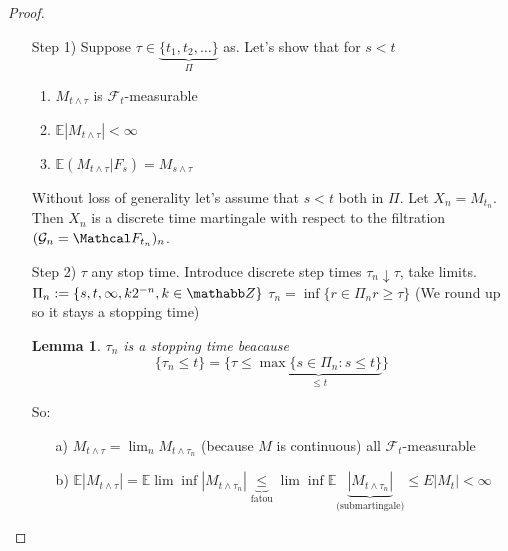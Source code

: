 \documentclass{article}
\newtheorem{lemma}[theorem]{Lemma}
\begin{document}
\begin{proof}
  \begin{enumerate}
  \item[Step 1)]
    Suppose $\tau \in \underbrace{\{t_1, t_2, \ldots\}}_{\Pi}$ as. Let's show that for $s < t$
    \begin{enumerate}
    \item $M_{t\wedge \tau}$ is $\mathcal F_t$-measurable
    \item $\mathbb E |M_{t\wedge \tau}| < \infty$
    \item $\mathbb E(M_{t\wedge \tau} |F_s) = M_{s \wedge \tau}$
    \end{enumerate}

    Without loss of generality let's assume that $s < t$ both in $\Pi$.
    Let $X_n = M_{t_n}$. Then $X_n$ is a discrete time martingale with respect to the filtration $(\mathcal G_n = \Mathcal F_{t_n})_n$.
  \item[Step 2)]
    $\tau$ any stop time.
    Introduce discrete step times $\tau_n \downarrow \tau$, take limits.
    $\Pi_n := \{ s, t, \infty, k2^{-n}, k \in \mathabb Z\}$
    $\tau_n = \inf \{ r \in \Pi_n r \ge \tau \}$ (We round up so it stays a stopping time)
    \begin{lemma}
      $\tau_n$ is a stopping time beacause $$\{ \tau_n \le t \} = \{ \tau \le \underbrace{\max \{s \in \Pi_n : s \le t \}}_{\le t} \}$$
    \end{lemma}
    So:
    \begin{itemize}
    \item[a)] $M_{t\wedge \tau} = \lim_n M_{t \wedge \tau_n}$ (because $M$ is continuous) all $\mathcal F_t$-measurable
    \item[b)] $\mathbb E|M_{t \wedge \tau}|  = \mathbb E \lim\inf |M_{t \wedge \tau_n}| \underbrace{\le}_{\text{fatou}} \lim\inf \mathbb E \underbrace{|M_{t \wedge \tau_n}|}_{\text{(submartingale)}} \le E|M_t| < \infty$
    \end{itemize}

  \end{enumerate}
\end{proof}
\end{document}
